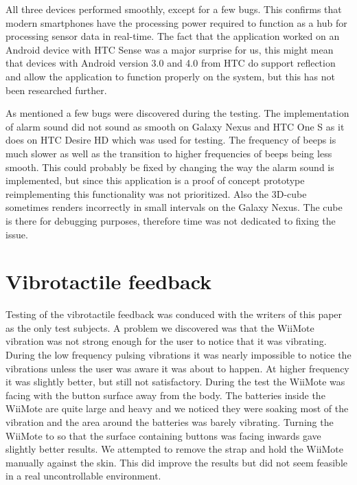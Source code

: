 All three devices performed smoothly, except for a few bugs. This confirms that modern smartphones have the processing power required to function as a hub for processing sensor data in real-time. The fact that the application worked on an Android device with HTC Sense was a major surprise for us, this might mean that devices with Android version 3.0 and 4.0 from HTC do support reflection and allow the application to function properly on the system, but this has not been researched further.

As mentioned a few bugs were discovered during the testing. The implementation of alarm sound did not sound as smooth on Galaxy Nexus and HTC One S as it does on HTC Desire HD which was used for testing. The frequency of beeps is much slower as well as the transition to higher frequencies of beeps being less smooth. This could probably be fixed by changing the way the alarm sound is implemented, but since this application is a proof of concept prototype reimplementing this functionality was not prioritized. Also the 3D-cube sometimes renders incorrectly in small intervals on the Galaxy Nexus. The cube is there  for debugging purposes, therefore time was not dedicated to fixing the issue.

\section{Vibrotactile feedback}
Testing of the vibrotactile feedback was conduced with the writers of this paper as the only test subjects. A problem we discovered was that the WiiMote vibration was not strong enough for the user to notice that it was vibrating. During the low frequency pulsing vibrations it was nearly impossible to notice the vibrations unless the user was aware it was about to happen. At higher frequency it was slightly better, but still not satisfactory. During the test the WiiMote was facing with the button surface away from the body. The batteries inside the WiiMote are quite large and heavy and we noticed they were soaking most of the vibration and the area around the batteries was barely vibrating. Turning the WiiMote to  so that the surface containing buttons was facing inwards gave slightly better results. We attempted to remove the strap and hold the WiiMote manually against the skin. This did improve the results but did not seem feasible in a real uncontrollable environment.